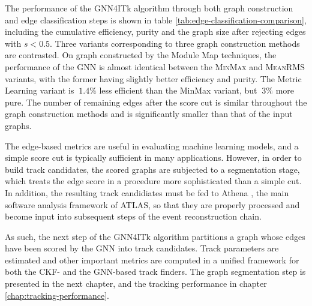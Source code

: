 The performance of the GNN4ITk algorithm through both graph construction and edge classification steps is shown in table \ref{tab:edge-classification-comparison}, including 
the cumulative efficiency, purity and the graph size after rejecting edges with $s<0.5$.
Three variants corresponding to three graph construction methods are contrasted.
On graph constructed by the Module Map techniques, the performance of the GNN is almost identical between the \textsc{MinMax} and \textsc{MeanRMS} variants, with the 
former having slightly better efficiency and purity.
The Metric Learning variant is $~1.4\%$ less efficient than the MinMax variant, but $~3\%$ more pure.
The number of remaining edges after the score cut is similar throughout the graph construction methods and is significantly smaller than that of the 
input graphs. 

The edge-based metrics are useful in evaluating machine learning models, and a simple score cut is typically sufficient in many applications. 
However, in order to build track candidates, the scored graphs are subjected to a segmentation stage, which 
treats the edge score in a procedure more sophisticated than a simple cut.
In addition, the resulting track candidiates must be fed to Athena \cite{atlas_collaboration_2021_4772550}, the main software analysis framework of ATLAS, 
so that they are properly processed and become input into subsequent steps of the event reconstruction chain.

As such, the next step of the GNN4ITk algorithm partitions a graph whose edges have been scored by the GNN into track candidates. 
Track parameters are estimated and other important metrics are computed in a unified framework for both the CKF- and the GNN-based track finders.
The graph segmentation step is presented in the next chapter, and the tracking performance in chapter \ref{chap:tracking-performance}.

